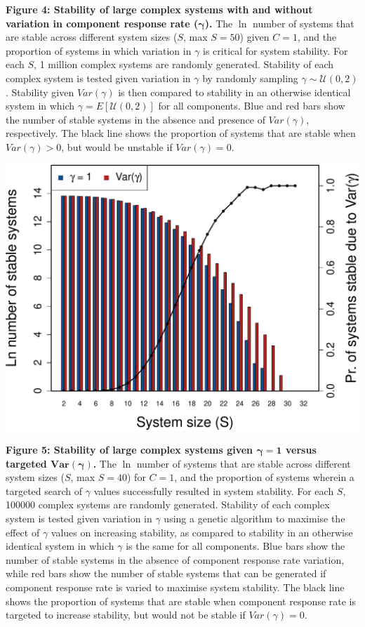 \documentclass[]{article}
\begin{document}
\clearpage

\textbf{Figure 4: Stability of large complex systems with and without
variation in component response rate (\(\boldsymbol{\gamma}\)).} The
\(\ln\) number of systems that are stable across different system sizes
(\(S\), max \(S=50\)) given \(C = 1\), and the proportion of systems in
which variation in \(\gamma\) is critical for system stability. For each
\(S\), 1 million complex systems are randomly generated. Stability of
each complex system is tested given variation in \(\gamma\) by randomly
sampling \(\gamma \sim \mathcal{U}(0, 2)\). Stability given
\(Var(\gamma)\) is then compared to stability in an otherwise identical
system in which \(\gamma = E[\mathcal{U}(0, 2)]\) for all components.
Blue and red bars show the number of stable systems in the absence and
presence of \(Var(\gamma)\), respectively. The black line shows the
proportion of systems that are stable when \(Var(\gamma) > 0\), but
would be unstable if \(Var(\gamma) = 0\).

\includegraphics{ms_files/figure-latex/unnamed-chunk-14-1.pdf}

\clearpage

\textbf{Figure 5: Stability of large complex systems given
\(\boldsymbol{\gamma = 1}\) versus targeted
\(\boldsymbol{Var(\gamma)}\).} The \(\ln\) number of systems that are
stable across different system sizes (\(S\), max \(S=40\)) for
\(C = 1\), and the proportion of systems wherein a targeted search of
\(\gamma\) values successfully resulted in system stability. For each
\(S\), 100000 complex systems are randomly generated. Stability of each
complex system is tested given variation in \(\gamma\) using a genetic
algorithm to maximise the effect of \(\gamma\) values on increasing
stability, as compared to stability in an otherwise identical system in
which \(\gamma\) is the same for all components. Blue bars show the
number of stable systems in the absence of component response rate
variation, while red bars show the number of stable systems that can be
generated if component response rate is varied to maximise system
stability. The black line shows the proportion of systems that are
stable when component response rate is targeted to increase stability,
but would not be stable if \(Var(\gamma) = 0\).
\end{document}
